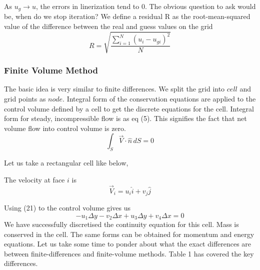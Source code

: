 \documentclass[12pt]{article}
\begin{document}
As $u_{g} \xrightarrow{} u$, the errors in linerization tend to 0. The obvious question to ask would be, when do we stop iteration? We define a residual R as the root-mean-squared value of the difference between the real and guess values on the grid
\begin{equation}
    R = \sqrt{\frac{\sum_{i=1}^{N} (u_i - u_{gi})^{2}}{N}}
\end{equation}
\subsubsection{Finite Volume Method}
The basic idea is very similar to finite differences. We split the grid into $\textit{cell}$ and grid points as $\textit{node}$. Integral form of the conservation equations are applied to the control volume defined by a cell to get the discrete equations for the cell. Integral form for steady, incompressible flow is as eq (5). This signifies the fact that net volume flow into control volume is zero.
\begin{equation}
    \int_{S} \Vec{V} \cdot \hat{n}\, dS = 0
\end{equation}

Let us take a rectangular cell like below, 

\begin{center}
    

\end{center}
The velocity at face $i$ is 
\begin{equation*}
    \Vec{V}_{i} = u_{i} \hat{i} + v_{j} \hat{j}
\end{equation*}

Using (21) to the control volume gives us 
\begin{equation}
-u_1\Delta y - v_2\Delta x + u_3\Delta y + v_4\Delta x = 0
\end{equation}
We have successfully discretised the continuity equation for this cell. Mass is conserved in the cell. The same forms can be obtained for momentum and energy equations. Let us take some time to ponder about what the exact differences are between finite-differences and finite-volume methods. Table 1 has covered the key differences.\\
\FloatBarrier 
\end{document}
